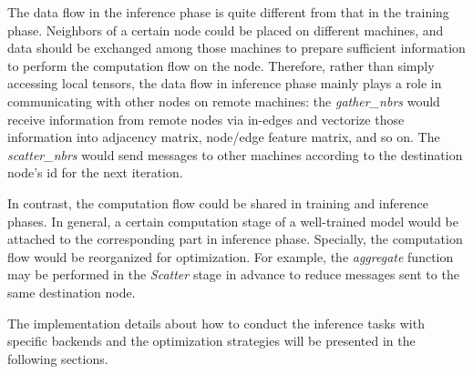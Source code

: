 \documentclass[conference]{IEEEtran}
\begin{document}
The data flow in the inference phase is quite different from that in the training phase.
Neighbors of a certain node could be placed on different machines, and data should be exchanged among those machines to prepare sufficient information to perform the computation flow on the node.
Therefore, rather than simply accessing local tensors, the data flow in inference phase mainly plays a role in communicating with other nodes on remote machines:
the \emph{gather\_nbrs} would receive information from remote nodes via in-edges and vectorize those information into adjacency matrix,  node/edge feature matrix, and so on.
The \emph{scatter\_nbrs} would send messages to other machines according to the destination node's id for the next iteration.

In contrast, the computation flow could be shared in training and inference phases.
In general, a certain computation stage of a well-trained model would be attached to the corresponding part in inference phase.
Specially, the computation flow would be reorganized for optimization.
For example, the \emph{aggregate} function may be performed in the \emph{Scatter} stage in advance to reduce messages sent to the same destination node.

The implementation details about how to conduct the inference tasks with specific backends and the optimization strategies will be presented in the following sections.


\end{document}
